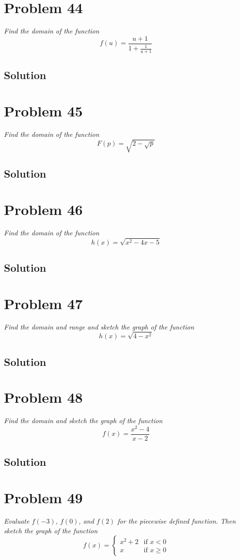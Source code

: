 \documentclass[11pt]{article}
\newcommand{\soln}{\subsection*}
\newcommand{\qn}{\textit}
\begin{document}
\section*{Problem 44}

\qn{Find the domain of the function $$f(u)=\frac{u+1}{1+\frac{1}{u+1}}$$}

\soln{Solution}

\section*{Problem 45}

\qn{Find the domain of the function $$F(p)=\sqrt{2-\sqrt{p}}$$}

\soln{Solution}

\section*{Problem 46}

\qn{Find the domain of the function $$h(x)=\sqrt{x^2-4x-5}$$}

\soln{Solution}

\section*{Problem 47}

\qn{Find the domain and range and sketch the graph of the function $$h(x)=\sqrt{4-x^2}$$}

\soln{Solution}

\section*{Problem 48}

\qn{Find the domain and sketch the graph of the function $$f(x)=\frac{x^2-4}{x-2}$$}

\soln{Solution}

\section*{Problem 49}

\qn{Evaluate $f(-3)$, $f(0)$, and $f(2)$ for the piecewise defined function. Then sketch the graph of the function}
\begin{equation}
	f(x)=
	\begin{cases}
		x^2+2 & \text{if } x < 0\\
		x & \text{if } x \ge 0
	\end{cases}
\end{equation}
\end{document}
